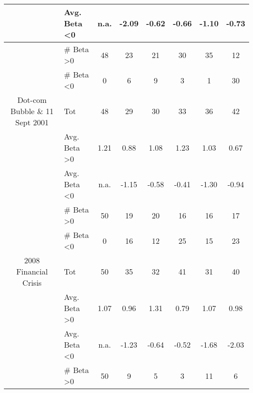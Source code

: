 \documentclass[12pt]{article}
\begin{document}
\begin{table}[]
{\begin{tabular}{@{}clcccccc@{}}
                               & Avg. Beta \textless 0    & n.a.            & -2.09              & -0.62         & -0.66             & -1.10                   & -0.73            \\ \midrule
                               & \# Beta \textgreater 0   & 48              & 23                 & 21            & 30                & 35                      & 12               \\
                               & \# Beta \textless 0      & 0               & 6                  & 9             & 3                 & 1                       & 30               \\
Dot-com Bubble \& 11 Sept 2001 & Tot                      & 48              & 29                 & 30            & 33                & 36                      & 42               \\
                               & Avg. Beta \textgreater 0 & 1.21            & 0.88               & 1.08          & 1.23              & 1.03                    & 0.67             \\
                               & Avg. Beta \textless 0    & n.a.            & -1.15              & -0.58         & -0.41             & -1.30                   & -0.94            \\ \midrule
                               & \# Beta \textgreater 0   & 50              & 19                 & 20            & 16                & 16                      & 17               \\
                               & \# Beta \textless 0      & 0               & 16                 & 12            & 25                & 15                      & 23               \\
2008 Financial Crisis          & Tot                      & 50              & 35                 & 32            & 41                & 31                      & 40               \\
                               & Avg. Beta \textgreater 0 & 1.07            & 0.96               & 1.31          & 0.79              & 1.07                    & 0.98             \\
                               & Avg. Beta \textless 0    & n.a.            & -1.23              & -0.64         & -0.52             & -1.68                   & -2.03            \\ \midrule
                               & \# Beta \textgreater 0   & 50              & 9                  & 5             & 3                 & 11                      & 6                \\

\end{tabular}}
\end{table}
\end{document}
